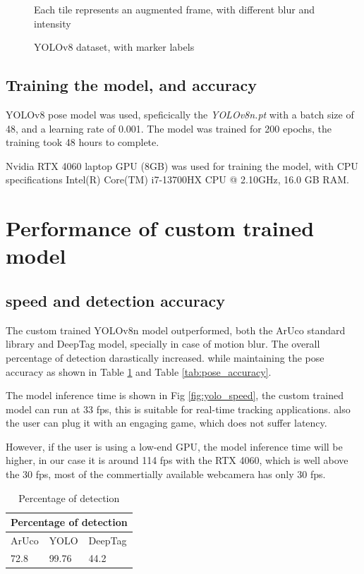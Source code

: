 \documentclass[12pt, twoside]{report}
\begin{document}
\begin{figure}
    \centering
    \caption{YOLOv8 dataset, with marker labels}
    {Each tile represents an augmented frame, with different blur and intensity}
    \label{fig:dataset_img}
\end{figure}






\subsection{Training the model, and accuracy}

YOLOv8 pose model was used, speficically the \textit{YOLOv8n.pt}
with a batch size of 48, and a learning rate of 0.001. The model was trained for 200 epochs,
the training took 48 hours to complete.

Nvidia RTX 4060 laptop GPU (8GB) was used for training the model, with CPU specifications
Intel(R) Core(TM) i7-13700HX CPU @ 2.10GHz, 16.0 GB RAM.


\section{Performance of custom trained model}

\subsection{speed and detection accuracy}

The custom trained YOLOv8n model outperformed, both the ArUco standard library and DeepTag model,
specially in case of motion blur. The overall percentage of detection darastically increased.
while maintaining the pose accuracy as shown in Table \ref{tab:percentage_detection} and Table \ref{tab:pose_accuracy}.

The model inference time is shown in Fig \ref{fig:yolo_speed}, the custom trained
model can run at 33 fps, this is suitable for real-time tracking applications.
also the user can plug it with an engaging game, which does not suffer latency.

However, if the user is using a low-end GPU, the model inference time will be higher,
in our case it is around 114 fps with the RTX 4060, which is well above the 30 fps, most of the commertially
available webcamera has only 30 fps.

\begin{table}[]
    \centering
    \begin{tabular}{|lll|}
        \hline
        \multicolumn{3}{|l|}{Percentage of detection}                      \\ \hline
        \multicolumn{1}{|l|}{ArUco} & \multicolumn{1}{l|}{YOLO}  & DeepTag \\ \hline
        \multicolumn{1}{|l|}{72.8}  & \multicolumn{1}{l|}{99.76} & 44.2    \\ \hline
    \end{tabular}
    \caption{Percentage of detection}
    \label{tab:percentage_detection}

\end{table}
\end{document}
